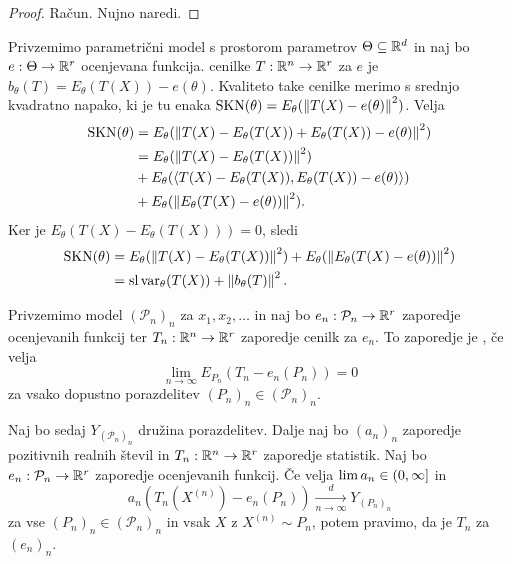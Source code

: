 \begin{proof}
  Račun.
  Nujno naredi.
\end{proof}


Privzemimo parametrični model s prostorom parametrov $\Theta \subseteq \mathbb{R}^d$ in
naj bo $e: \Theta \to \mathbb{R}^r$ ocenjevana funkcija.
 cenilke $T: \mathbb{R}^n \to \mathbb{R}^r$ za $e$ je $b_\theta(T) =
E_\theta(T(X)) - e(\theta)$.
Kvaliteto take cenilke merimo s srednjo kvadratno napako, ki je tu enaka
$\operatorname{SKN}(\theta) = E_\theta(\left\lVert T(X) - e(\theta)\right\rVert^2)$.
Velja
\begin{align*}
  \operatorname{SKN}(\theta)
  &= E_\theta(\left\lVert T(X) - E_\theta(T(X)) + E_\theta(T(X)) - e(\theta)\right\rVert^2) \\
  &= E_\theta(\left\lVert T(X) - E_\theta(T(X))\right\rVert^2) \\
  &+ E_\theta(\left< T(X) - E_\theta(T(X)), E_\theta(T(X)) - e(\theta) \right>) \\
  &+ E_\theta(\left\lVert E_\theta(T(X) - e(\theta))\right\rVert^2).
\end{align*}
Ker je $E_\theta(T(X) - E_\theta(T(X))) = 0$, sledi
\begin{align*}
  \operatorname{SKN}(\theta)
  &= E_\theta(\left\lVert T(X) - E_\theta(T(X))\right\rVert^2)
  + E_\theta(\left\lVert E_\theta(T(X) - e(\theta))\right\rVert^2) \\
  &= \operatorname{sl} \operatorname{var}_\theta(T(X)) + \left\lVert b_\theta(T)\right\rVert^2.
\end{align*}

\begin{definicija}
  \label{stat2:def:nepristransko-v-limiti}
  Privzemimo model $(\mathcal{P}_n)_n$ za $x_1, x_2, \ldots$ in naj bo $e_n:
  \mathcal{P}_n \to \mathbb{R}^r$ zaporedje ocenjevanih funkcij ter $T_n: \mathbb{R}^n \to \mathbb{R}^r$
  zaporedje cenilk za $e_n$. To zaporedje je , če velja
  \[
	\lim_{n \to \infty} E_{P_n}(T_n - e_n(P_n)) = 0
  \]
  za vsako dopustno porazdelitev $(P_n)_n \in (\mathcal{P}_n)_n$.
\end{definicija}

\begin{definicija}
  Naj bo sedaj $Y_{(\mathcal{P}_n)_n}$ družina porazdelitev. Dalje naj bo
  $(a_n)_n$ zaporedje pozitivnih realnih števil in $T_n: \mathbb{R}^n \to \mathbb{R}^r$
  zaporedje statistik. Naj bo $e_n: \mathcal{P}_n \to \mathbb{R}^r$ zaporedje
  ocenjevanih funkcij. Če velja $\lim a_n \in \left(0, \infty\right]$ in
  \[
	a_n (T_n(X^{(n)}) - e_n(P_n)) \xrightarrow[n \to \infty]{d} Y_{(P_n)_n}
  \]
  za vse $(P_n)_n \in (\mathcal{P}_n)_n$ in vsak $X$ z $X^{(n)} \sim P_n$, potem
  pravimo, da je $T_n$  za
  $(e_n)_n$.
\end{definicija}

